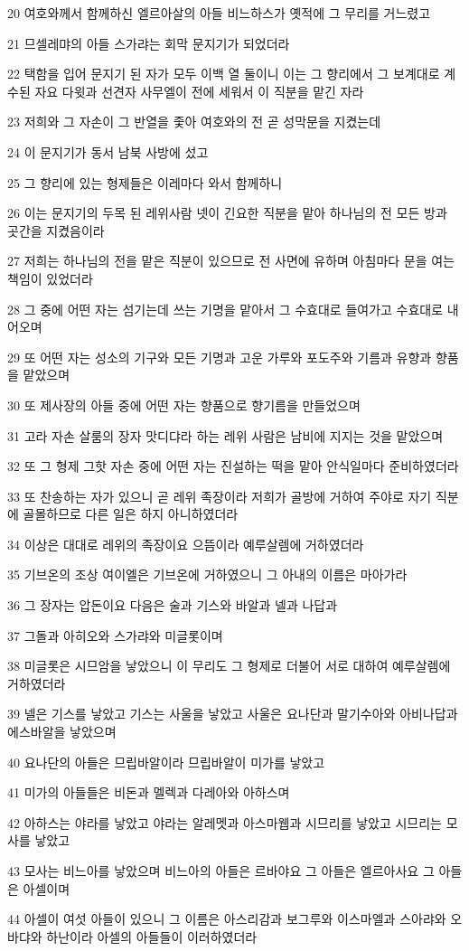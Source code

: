 \par 20 여호와께서 함께하신 엘르아살의 아들 비느하스가 옛적에 그 무리를 거느렸고
\par 21 므셀레먀의 아들 스가랴는 회막 문지기가 되었더라
\par 22 택함을 입어 문지기 된 자가 모두 이백 열 둘이니 이는 그 향리에서 그 보계대로 계수된 자요 다윗과 선견자 사무엘이 전에 세워서 이 직분을 맡긴 자라
\par 23 저희와 그 자손이 그 반열을 좇아 여호와의 전 곧 성막문을 지켰는데
\par 24 이 문지기가 동서 남북 사방에 섰고
\par 25 그 향리에 있는 형제들은 이레마다 와서 함께하니
\par 26 이는 문지기의 두목 된 레위사람 넷이 긴요한 직분을 맡아 하나님의 전 모든 방과 곳간을 지켰음이라
\par 27 저희는 하나님의 전을 맡은 직분이 있으므로 전 사면에 유하며 아침마다 문을 여는 책임이 있었더라
\par 28 그 중에 어떤 자는 섬기는데 쓰는 기명을 맡아서 그 수효대로 들여가고 수효대로 내어오며
\par 29 또 어떤 자는 성소의 기구와 모든 기명과 고운 가루와 포도주와 기름과 유향과 향품을 맡았으며
\par 30 또 제사장의 아들 중에 어떤 자는 향품으로 향기름을 만들었으며
\par 31 고라 자손 살룸의 장자 맛디댜라 하는 레위 사람은 남비에 지지는 것을 맡았으며
\par 32 또 그 형제 그핫 자손 중에 어떤 자는 진설하는 떡을 맡아 안식일마다 준비하였더라
\par 33 또 찬송하는 자가 있으니 곧 레위 족장이라 저희가 골방에 거하여 주야로 자기 직분에 골몰하므로 다른 일은 하지 아니하였더라
\par 34 이상은 대대로 레위의 족장이요 으뜸이라 예루살렘에 거하였더라
\par 35 기브온의 조상 여이엘은 기브온에 거하였으니 그 아내의 이름은 마아가라
\par 36 그 장자는 압돈이요 다음은 술과 기스와 바알과 넬과 나답과
\par 37 그돌과 아히오와 스가랴와 미글롯이며
\par 38 미글롯은 시므암을 낳았으니 이 무리도 그 형제로 더불어 서로 대하여 예루살렘에 거하였더라
\par 39 넬은 기스를 낳았고 기스는 사울을 낳았고 사울은 요나단과 말기수아와 아비나답과 에스바알을 낳았으며
\par 40 요나단의 아들은 므립바알이라 므립바알이 미가를 낳았고
\par 41 미가의 아들들은 비돈과 멜렉과 다레아와 아하스며
\par 42 아하스는 야라를 낳았고 야라는 알레멧과 아스마웹과 시므리를 낳았고 시므리는 모사를 낳았고
\par 43 모사는 비느아를 낳았으며 비느아의 아들은 르바야요 그 아들은 엘르아사요 그 아들은 아셀이며
\par 44 아셀이 여섯 아들이 있으니 그 이름은 아스리감과 보그루와 이스마엘과 스아랴와 오바댜와 하난이라 아셀의 아들들이 이러하였더라

